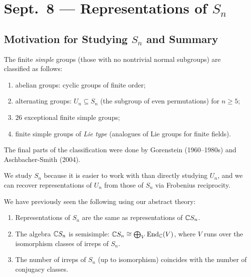 \chapter{Sept.~8 --- Representations of \texorpdfstring{$S_n$}{Sn}}

\section{Motivation for Studying \texorpdfstring{$S_n$}{Sn} and Summary}

\begin{remark}
  The finite \emph{simple} groups
  (those with no nontrivial normal subgroups)
  are classified as follows:
  \begin{enumerate}
    \item abelian groups: cyclic groups of
      finite order;
    \item alternating groups:
      $U_n \subseteq S_n$ (the subgroup of
      even permutations) for $n \ge 5$;
    \item $26$ exceptional finite simple
      groups;
    \item finite simple groups of
      \emph{Lie type} (analogues of
      Lie groups for finite fields).
  \end{enumerate}
  The final parts of the classification
  were done by
  Gorenstein (1960--1980s) and
  Aschbacher-Smith (2004).
\end{remark}
  
\begin{remark}
  We study $S_n$ because it is
  easier to work with than directly
  studying $U_n$, and we can recover
  representations of $U_n$
  from those of $S_n$ via
  Frobenius reciprocity.
\end{remark}

\begin{remark}
  We have previously seen the following
  using our abstract theory:
  \begin{enumerate}
    \item Representations of $S_n$
      are the same as representations of
      $\mathbb{C} S_n$.
    \item The algebra $\mathbb{C} S_n$ is
      semisimple:
      $\mathbb{C} S_n \cong \bigoplus_V \operatorname{End}_{\mathbb{C}}(V)$,
      where $V$ runs over the isomorphism
      classes of irreps of $S_n$.
    \item The number of irreps of $S_n$
      (up to isomorphism) coincides with
      the number of conjugacy classes.
  \end{enumerate}
\end{remark}

